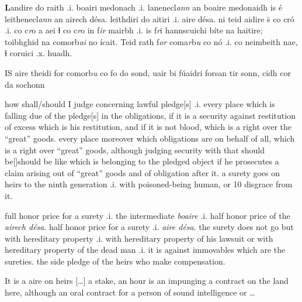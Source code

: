 \documentclass[11pt]{article}
\begin{document}
\begin{pages}
\begin{Leftside}
    \pstart
    \textbf{L}andire do raith .i. boairi medonach .i. lanenecl\emph{ann} an boaire medonaidh is \'{e} leithenecl\emph{ann} an airech d\'{e}sa. leithdiri do aitiri .i. aire d\'{e}sa. ni teid aidire \={s} co cr\'{o} .i. co c\emph{r}o a aei ɫ co c\emph{r}o in f\emph{ir} mairbh .i. is f\emph{r}i hannscuichi b\'{i}te na haitire; toibhghid na comorb\emph{ai} no \'{i}cait. Teid rath f\emph{or} coma\emph{r}b\emph{u} co  n\'{o} .i. co neimbeith nae, ɫ coruici .x. huadh.
    \pend
    
    \pstart
    IS aire theidi for comorb\emph{u} co fo do sond, uair bi f\'{u}aidri forsan tir sonn, cidh cor da sochonn  
    \pend
    \endnumbering
  \end{Leftside}

\begin{Rightside}
    \beginnumbering
   \pstart
   how shall/should I judge concerning lawful pledge[s] .i. every place which is falling due of the pledge[s] in the obligations, if it is a security against restitution of excess which is his restitution, and if it is not blood, which is a right over the \enquote{great} goods. every place moreover which obligations are on behalf of all, which is a right over \enquote{great} goods, although judging security with that should be[\hspace{2mm}]should be like which is belonging to the pledged object if he prosecutes a claim arising out of \enquote{great} goods and of obligation after it.  a surety goes on heirs to the ninth generation .i. with poisoned-being human, or 10 disgrace from it.
    \pend

    \pstart
    full honor price for a surety .i. the intermediate \emph{boaire} .i. half honor price of the \emph{airech d\'{e}sa}. half honor price for a surety .i. \emph{aire d\'{e}sa}. the surety does not go but with hereditary property .i. with hereditary property of his lawsuit or with hereditary property of the dead man .i. it is against immovables which are the sureties. the side pledge of the heirs who make compensation. 
    \pend

    \pstart
    It is a aire on heirs [\ldots] a stake, an hour is an impunging a contract on the land here, although an oral contract for a person of sound intelligence or \ldots
    \pend
    \endnumbering
  \end{Rightside}
  \Pages
\end{pages}
\end{document}
